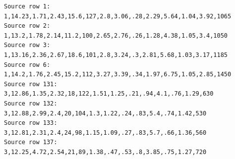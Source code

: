 \begingroup\scriptsize
\begin{verbatim}
Source row 1:
1,14.23,1.71,2.43,15.6,127,2.8,3.06,.28,2.29,5.64,1.04,3.92,1065
Source row 2:
1,13.2,1.78,2.14,11.2,100,2.65,2.76,.26,1.28,4.38,1.05,3.4,1050
Source row 3:
1,13.16,2.36,2.67,18.6,101,2.8,3.24,.3,2.81,5.68,1.03,3.17,1185
Source row 6:
1,14.2,1.76,2.45,15.2,112,3.27,3.39,.34,1.97,6.75,1.05,2.85,1450
Source row 131:
3,12.86,1.35,2.32,18,122,1.51,1.25,.21,.94,4.1,.76,1.29,630
Source row 132:
3,12.88,2.99,2.4,20,104,1.3,1.22,.24,.83,5.4,.74,1.42,530
Source row 133:
3,12.81,2.31,2.4,24,98,1.15,1.09,.27,.83,5.7,.66,1.36,560
Source row 137:
3,12.25,4.72,2.54,21,89,1.38,.47,.53,.8,3.85,.75,1.27,720
\end{verbatim}
\endgroup
